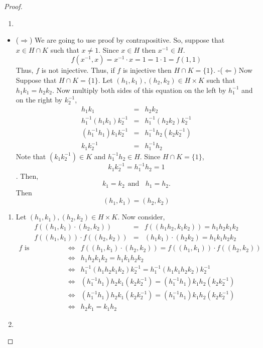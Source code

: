\documentclass[
]{book}
\providecommand{\tightlist}{%
  \setlength{\itemsep}{0pt}\setlength{\parskip}{0pt}}
\theoremstyle{definition}
\theoremstyle{definition}
\theoremstyle{definition}
\theoremstyle{definition}
\theoremstyle{remark}
\begin{document}
\begin{proof}
\leavevmode

\begin{enumerate}
\def\labelenumi{\alph{enumi}.}
\tightlist
\item
\end{enumerate}

\begin{itemize}
\tightlist
\item
  (\(\Longrightarrow\)) We are going to use proof by contrapositive. So, suppose that \(x\in H\cap K\) such that \(x \neq 1\). Since \(x\in H\) then \(x^{-1} \in H\).
  \[f(x^{-1},x)=x^{-1}\cdot x=1=1\cdot 1=f(1,1)\]
  Thus, \(f\) is not injective. Thus, if \(f\) is injective then \(H \cap K = \{1\}\).
  -(\(\Longleftarrow\))
  Now Suppose that \(H \cap K = \{1\}\). Let \((h_1, k_1),(h_2, k_2)\in H \times K\) such that \(h_1k_1 = h_2k_2\). Now multiply both sides of this equation on the left by \(h_1^{-1}\) and on the right by \(k_2^{-1}\),
  \begin{eqnarray}
  h_1k_1 &=& h_2k_2\\
  h_1^{-1}(h_1k_1)k_2^{-1} &=& h_1^{-1}(h_2k_2)k_2^{-1}\\
  (h_1^{-1}h_1)k_1k_2^{-1} &=& h_1^{-1}h_2(k_2k_2^{-1})\\
  k_1k_2^{-1} &=& h_1^{-1}h_2
  \end{eqnarray}
  Note that \((k_1k_2^{-1})\in K\) and \(h_1^{-1}h_2\in H\). Since \(H \cap K = \{1\}\), \[k_1k_2^{-1} = h_1^{-1}h_2 = 1\]. Then,
  \[
  k_1=k_2~~\text{and}~~~~h_1=h_2.
  \]
  Then \[(h_1, k_1) = (h_2, k_2)\]
\end{itemize}

\begin{enumerate}
\def\labelenumi{\alph{enumi}.}
\setcounter{enumi}{1}
\tightlist
\item
  Let \((h_1, k_1),(h_2, k_2)\in H \times K\). Now consider,
  \begin{eqnarray}
  f((h_1,k_1)\cdot (h_2,k_2))&=&f((h_1h_2,k_1k_2))=h_1h_2k_1k_2\\
  f((h_1,k_1))\cdot f((h_2,k_2))&=& (h_1k_1)\cdot(h_2k_2)=h_1k_1h_2k_2
  \end{eqnarray}
  \begin{eqnarray}
  f\text{ is homorphism} &\iff & 
  f((h_1,k_1)\cdot (h_2,k_2))=f((h_1,k_1))\cdot f((h_2,k_2))\\
  &\iff & h_1h_2k_1k_2=h_1k_1h_2k_2\\
  &\iff & h_1^{-1}(h_1h_2k_1k_2)k_2^{-1}=h_1^{-1}(h_1k_1h_2k_2)k_2^{-1}\\
  &\iff & (h_1^{-1}h_1)h_2k_1(k_2k_2^{-1})=(h_1^{-1}h_1)k_1h_2(k_2k_2^{-1})\\
  &\iff & (h_1^{-1}h_1)h_2k_1(k_2k_2^{-1})=(h_1^{-1}h_1)k_1h_2(k_2k_2^{-1})\\
  &\iff & h_2k_1=k_1h_2
  \end{eqnarray}
\item
\end{enumerate}


\end{proof}
\end{document}
